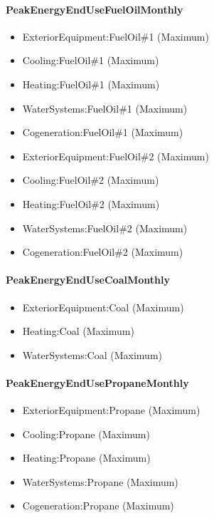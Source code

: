 \paragraph{PeakEnergyEndUseFuelOilMonthly}\label{peakenergyendusefueloilmonthly}

\begin{itemize}
\item
  ExteriorEquipment:FuelOil\#1 (Maximum)
\item
  Cooling:FuelOil\#1 (Maximum)
\item
  Heating:FuelOil\#1 (Maximum)
\item
  WaterSystems:FuelOil\#1 (Maximum)
\item
  Cogeneration:FuelOil\#1 (Maximum)
\item
  ExteriorEquipment:FuelOil\#2 (Maximum)
\item
  Cooling:FuelOil\#2 (Maximum)
\item
  Heating:FuelOil\#2 (Maximum)
\item
  WaterSystems:FuelOil\#2 (Maximum)
\item
  Cogeneration:FuelOil\#2 (Maximum)
\end{itemize}

\paragraph{PeakEnergyEndUseCoalMonthly}\label{peakenergyendusecoalmonthly}

\begin{itemize}
\item
  ExteriorEquipment:Coal (Maximum)
\item
  Heating:Coal (Maximum)
\item
  WaterSystems:Coal (Maximum)
\end{itemize}

\paragraph{PeakEnergyEndUsePropaneMonthly}\label{peakenergyendusepropanemonthly}

\begin{itemize}
\item
  ExteriorEquipment:Propane (Maximum)
\item
  Cooling:Propane (Maximum)
\item
  Heating:Propane (Maximum)
\item
  WaterSystems:Propane (Maximum)
\item
  Cogeneration:Propane (Maximum)
\end{itemize}

